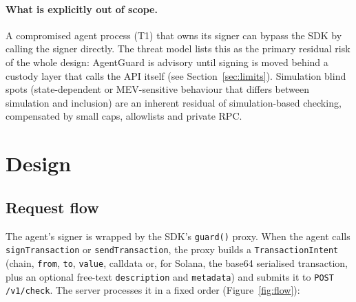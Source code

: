 \documentclass[10pt]{article}
\newcommand{\code}[1]{{\def\_{\char`\_\allowbreak}\texttt{#1}}}
\begin{document}
\paragraph{What is explicitly out of scope.} A compromised agent process (T1) that owns its signer can bypass the SDK by calling the signer directly. The threat model lists this as the primary residual risk of the whole design: AgentGuard is advisory until signing is moved behind a custody layer that calls the API itself (see Section~\ref{sec:limits}). Simulation blind spots (state-dependent or MEV-sensitive behaviour that differs between simulation and inclusion) are an inherent residual of simulation-based checking, compensated by small caps, allowlists and private RPC.

\section{Design}
\label{sec:design}

\subsection{Request flow}
\label{sec:flow}

The agent's signer is wrapped by the SDK's \code{guard()} proxy. When the agent calls \code{signTransaction} or \code{sendTransaction}, the proxy builds a \code{TransactionIntent} (chain, \code{from}, \code{to}, \code{value}, calldata or, for Solana, the base64 serialised transaction, plus an optional free-text \code{description} and \code{metadata}) and submits it to \code{POST /v1/check}. The server processes it in a fixed order (Figure~\ref{fig:flow}):
\end{document}
